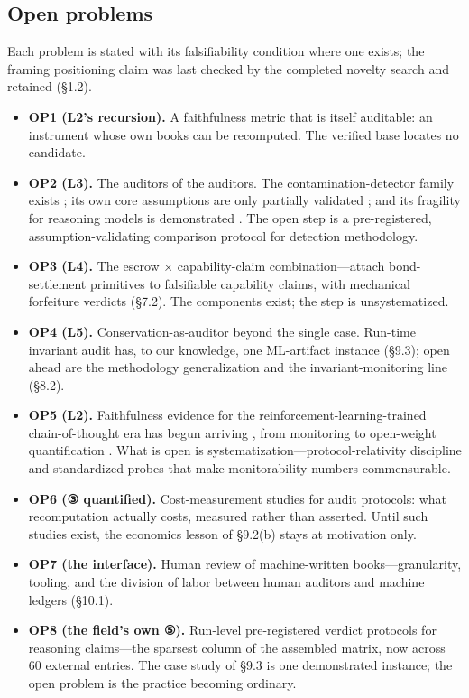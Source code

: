 \documentclass[11pt,a4paper]{article}
\begin{document}
\subsection{Open problems}

Each problem is stated with its falsifiability condition where one exists; the framing positioning claim was last checked by the completed novelty search and retained (§1.2).

\begin{itemize}[leftmargin=1.6em]
\item \textbf{OP1 (L2's recursion).} A faithfulness metric that is itself auditable: an instrument whose own books can be recomputed. The verified base locates no candidate.
\item \textbf{OP2 (L3).} The auditors of the auditors. The contamination-detector family exists \cite{key36,key37,key38,key39,key40,key41}; its own core assumptions are only partially validated \cite{key39}; and its fragility for reasoning models is demonstrated \cite{key42}. The open step is a pre-registered, assumption-validating comparison protocol for detection methodology.
\item \textbf{OP3 (L4).} The escrow × capability-claim combination—attach bond-settlement primitives \cite{key48,key49,key50} to falsifiable capability claims, with mechanical forfeiture verdicts (§7.2). The components exist; the step is unsystematized.
\item \textbf{OP4 (L5).} Conservation-as-auditor beyond the single case. Run-time invariant audit has, to our knowledge, one ML-artifact instance (§9.3); open ahead are the methodology generalization and the invariant-monitoring line (§8.2).
\item \textbf{OP5 (L2).} Faithfulness evidence for the reinforcement-learning-trained chain-of-thought era has begun arriving \cite{key29,key30,key31,key32,key34}, from monitoring \cite{key30} to open-weight quantification \cite{key32}. What is open is systematization—protocol-relativity discipline and standardized probes that make monitorability numbers commensurable.
\item \textbf{OP6 (③ quantified).} Cost-measurement studies for audit protocols: what recomputation actually costs, measured rather than asserted. Until such studies exist, the economics lesson of §9.2(b) stays at motivation only.
\item \textbf{OP7 (the interface).} Human review of machine-written books—granularity, tooling, and the division of labor between human auditors and machine ledgers (§10.1).
\item \textbf{OP8 (the field's own ⑤).} Run-level pre-registered verdict protocols for reasoning claims—the sparsest column of the assembled matrix, now across 60 external entries. The case study of §9.3 is one demonstrated instance; the open problem is the practice becoming ordinary.
\end{itemize}
\end{document}
